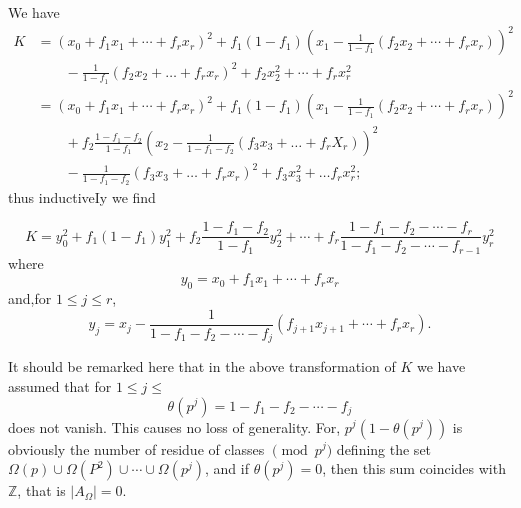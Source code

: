 We have
{\fontsize{10pt}{12pt}\selectfont
\begin{align*}
  K & = \left(x_0 + f_1 x_1 + \cdots+f_r
  x_r\right)^2+f_1(1-f_1) \left(x_1-\frac{1}{1-f_1}(f_2x_2+\cdots+f_r
  x_r)\right)^2\\ 
  & \qquad -\frac{1}{1-f_1} \left(f_2x_2+\ldots +f_r
  x_r\right)^2+f_2x^2_2+\cdots+f_r x^2_r\\ 
  &=\left(x_0+f_1x_1+\cdots +f_r
  x_r\right)^2+f_1(1-f_1) \left(x_1-\frac{1}{1-f_1}(f_2x_2+\cdots+f_r
  x_r)\right)^2\\
  &\qquad +f_2\frac{1-f_1-f_2}{1-f_1}\left(x_2-\frac{1}{1-f_1-f_2}(f_3x_3+
  \ldots+f_r X_r)\right)^2\\
  &\qquad -\frac{1}{1-f_1-f_2} (f_3x_3+\ldots+f_r x_r)^2
  +f_3x^2_3+\ldots f_r x^2_r; 
\end{align*}}\relax
thus inductiveIy we find

\begin{equation*}
  K=y^2_0+f_1(1-f_1)y^2_1+f_2 \frac{1-f_1-f_2}{1-f_1} y^2_2+
  \cdots+f_r \frac{1-f_1-f_2-\cdots -f_r}{1-f_1-f_2-\cdots
    -f_{r-1}} y^2_r \tag{1.1.14} \label{eq1.1.14}
\end{equation*}
where
\begin{equation*}
  y_0=x_0+f_1x_1+\cdots+f_r x_r \tag{1.1.15}\label{eq1.1.15}
\end{equation*}\pageoriginale
and,for $1\leq j\leq r$,
\begin{equation*}
  y_j = x_j-\frac{1}{1-f_1-f_2-\cdots - f_j}(f_{j+1}x_{j+1} +\cdots
  +f_r x_r). \tag{1.1.16} \label{eq1.1.16}
\end{equation*}

It should be remarked here that in the above transformation of $K$ we
have assumed that for $1 \leq j \leq$ 
\begin{equation*}
  \theta (p^{j}) = 1- f_1 - f_2 -\cdots -f_j
  \tag{1.1.17}\label{eq1.1.17} 
\end{equation*}
does not vanish. This causes no loss of generality. For, $p^j
(1-\theta (p^j))$ is obviously the number of residue of classes 
$\pmod{p^j}$ defining the set $\Omega (p) \cup \Omega (P^2) \cup \cdots \cup
\Omega (p^j)$, and if $\theta (p^j) =0$, then this sum coincides with
$\mathbb{Z}$, that is $|A_{\Omega}|=0$. 


